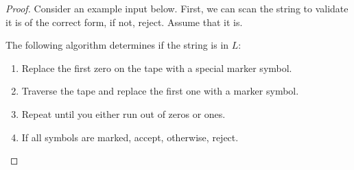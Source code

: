 \begin{proof}
	
	
	Consider an example input below.  First, we can scan the string to validate it is of the correct form, if not, reject.  Assume that it is.
	\begin{center}
		

	
		\end{center}
	
	The following algorithm determines if the string is in $L$:
	
	\begin{enumerate}
		\item[] Replace the first zero on the tape with a special marker symbol.
		\item[] Traverse the tape and replace the first one with a marker symbol.
		\item[] Repeat until you either run out of zeros or ones.
		
	
		
		\item[] If all symbols are marked, accept, otherwise, reject.
	\end{enumerate}
	

\end{proof}



